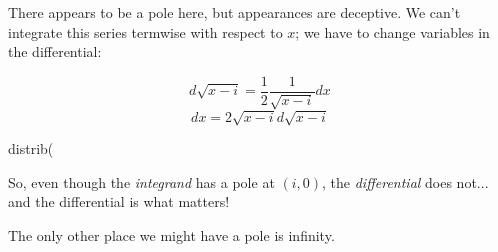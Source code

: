 There appears to be a pole here, but appearances are deceptive.
We can't integrate this series termwise with respect to $x$;
we have to change variables in the differential:

$$d \sqrt{x-i} = \frac{1}{2} \frac{1}{\sqrt{x-i}} dx$$
$$dx = 2 \sqrt{x-i} d \sqrt{x-i}$$

\begin{maximablock}
distrib(%
\end{maximablock}

\endexample

So, even though the {\it integrand} has a pole at $(i,0)$, the {\it
differential} does not... and the differential is what matters!

The only other place we might have a pole is infinity.

